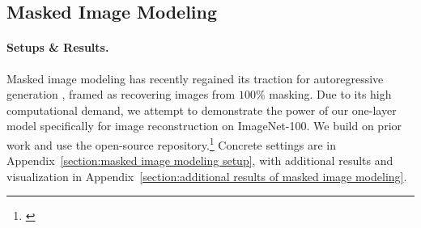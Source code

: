 \begin{table}[htbp]
\caption{Top-1 accuracy ($\%$) for image classification with 12-layer non-recurrent-depth models. Parameters are measured on ImageNet-1K. $^\dagger$ means first pretraining on ImageNet-1K and then fine-tuning on CIFAR-10/100.}
\label{tab:classification multi-layer}
\centering
{}
\end{table}


\subsection{Masked Image Modeling}
\paragraph{Setups \& Results.}
Masked image modeling has recently regained its traction for autoregressive generation \citep{li2023mage,li2024autoregressive}, framed as recovering images from $100\%$ masking. Due to its high computational demand, we attempt to demonstrate the power of our one-layer model specifically for image reconstruction on ImageNet-100. We build on prior work \citep{chang2022maskgit} and use the open-source repository.\footnote{\href{https://github.com/valeoai/Maskgit-pytorch}{}} Concrete settings are in Appendix~\ref{section:masked image modeling setup}, with additional results and visualization in Appendix~\ref{section:additional results of masked image modeling}.

